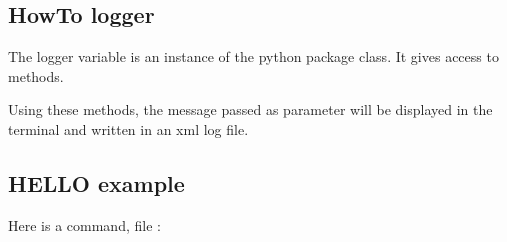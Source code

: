 \documentclass[a4paper,10pt,english]{sphinxmanual}
\begin{document}
%
\begin{sphinxVerbatim}[commandchars=\\\{\}]
\end{sphinxVerbatim}


\subsection{HowTo logger}
\label{\detokenize{write_command:howto-logger}}
The logger variable is an instance of the python  package class.
It gives access to  methods.

Using these methods, the message passed as parameter
will be displayed in the terminal and written in an xml log file.

%
\begin{sphinxVerbatim}[commandchars=\\\{\}]
\end{sphinxVerbatim}


\subsection{HELLO example}
\label{\detokenize{write_command:hello-example}}
Here is a  command, file :
\end{document}
